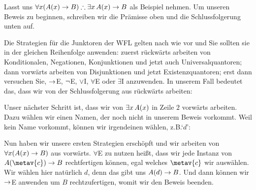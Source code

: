 Lasst uns $\forall x(\atom{A}{x} \eif B) \therefore \exists x\,\atom{A}{x} \eif B$ als Beispiel nehmen. Um unseren Beweis zu beginnen, schreiben wir die Prämisse oben und die Schlussfolgerung unten auf.
\begin{fitchproof}
\ellipsesline
{}
\end{fitchproof}
Die Strategien für die Junktoren der WFL gelten nach wie vor und Sie sollten sie in der gleichen Reihenfolge anwenden: zuerst rückwärts arbeiten von Konditionalen, Negationen, Konjunktionen und jetzt auch Universalquantoren; dann vorwärts arbeiten von Disjunktionen und jetzt Existenzquantoren; erst dann versuchen Sie, $\rightarrow$E, $\neg$E, $\lor$I, $\forall$E oder $\exists$I anzuwenden. In unserem Fall bedeutet das, dass wir von der Schlussfolgerung aus rückwärts arbeiten:
\begin{fitchproof}
	\open
	\ellipsesline
	\close
\end{fitchproof}
Unser nächster Schritt ist, dass wir von $\exists x\,\mathord{A}(x)$ in Zeile $2$ vorwärts arbeiten. Dazu wählen wir einen Namen, der noch nicht in unserem Beweis vorkommt. Weil kein Name vorkommt, können wir irgendeinen wählen, z.B.\@ `$d$':
\begin{fitchproof}
	\open
	\open
	\ellipsesline
	\close
	\close
\end{fitchproof}
Nun haben wir unsere ersten Strategien erschöpft und wir arbeiten von $\forall x(\mathord{A}(x) \rightarrow B)$ aus vorwärts. $\forall$E zu nutzen hei{\ss}t, dass wir jede Instanz von $A(\metav{c}) \eif B$ rechtfertigen können, egal welches $\metav{c}$ wir auswählen. Wir wählen hier natürlich $d$, denn das gibt uns $\mathord{A}(d) \rightarrow B$. Und dann können wir $\rightarrow$E anwenden um $B$ rechtzufertigen, womit wir den Beweis beenden.
\begin{fitchproof}
	\open
	\open
	\close
	\close
\end{fitchproof}

